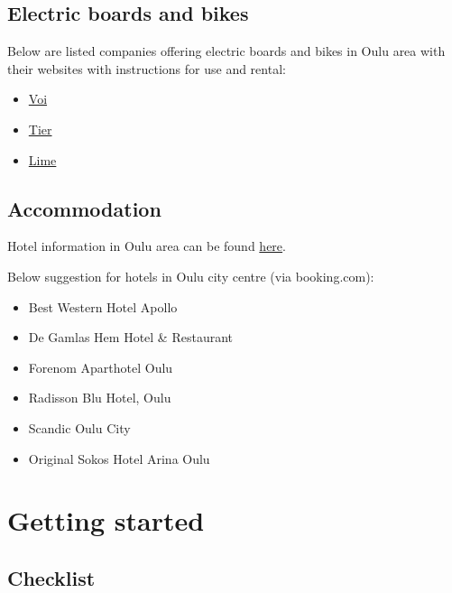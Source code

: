 \documentclass[
  oneside]{book}
\providecommand{\tightlist}{%
  \setlength{\itemsep}{0pt}\setlength{\parskip}{0pt}}
\begin{document}
\hypertarget{electric-boards-and-bikes}{%
\section{Electric boards and bikes}\label{electric-boards-and-bikes}}

Below are listed companies offering electric boards and bikes in Oulu area with their websites with instructions for use and rental:

\begin{itemize}
\tightlist
\item
  \href{https://www.voiscooters.com/}{Voi}
\item
  \href{https://www.tier.app/en/}{Tier}
\item
  \href{https://www.li.me/}{Lime}
\end{itemize}

\hypertarget{accommodation}{%
\section{Accommodation}\label{accommodation}}

Hotel information in Oulu area can be found
\href{https://visitoulu.fi/en/arrival-overnight/}{here}.

Below suggestion for hotels in Oulu city centre (via booking.com):

\begin{itemize}
\tightlist
\item
  Best Western Hotel Apollo
\item
  De Gamlas Hem Hotel \& Restaurant
\item
  Forenom Aparthotel Oulu
\item
  Radisson Blu Hotel, Oulu
\item
  Scandic Oulu City
\item
  Original Sokos Hotel Arina Oulu
\end{itemize}

\hypertarget{start}{%
\chapter{Getting started}\label{start}}

\hypertarget{checklist}{%
\section{Checklist}\label{checklist}}
\end{document}
